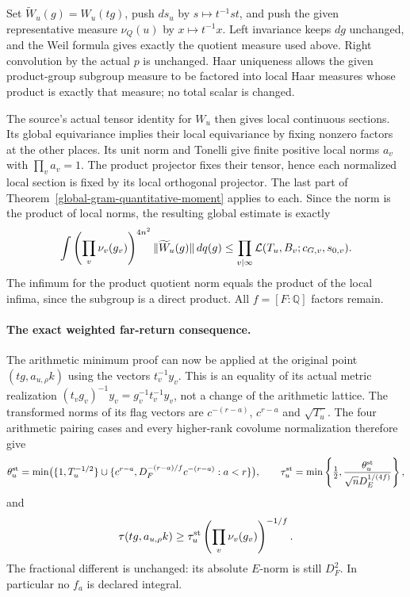Set $\widetilde W_u(g)=W_u(tg)$, push $ds_u$ by
$s\mapsto t^{-1}st$, and push the given representative measure
$\nu_Q(u)$ by $x\mapsto t^{-1}x$.  Left invariance keeps $dg$
unchanged, and the Weil formula gives exactly the quotient
measure used above.  Right convolution by the actual $p$ is
unchanged.  Haar uniqueness allows the given product-group
subgroup measure to be factored into local Haar measures whose
product is exactly that measure; no total scalar is changed.

The source's actual tensor identity for $W_u$ then gives local
continuous sections.  Its global equivariance implies their
local equivariance by fixing nonzero factors at the other
places.  Its unit norm and Tonelli give finite positive local
norms $a_v$ with $\prod_v a_v=1$.  The product projector fixes
their tensor, hence each normalized local section is fixed by
its local orthogonal projector.  The last part of
Theorem~\ref{global-gram-quantitative-moment} applies to each.
Since the norm is the product of local norms, the resulting
global estimate is exactly
\begin{equation}\label{global-gram-quantitative-global-L1}
 \int\left(\prod_v\nu_v(g_v)\right)^{4n^2}
           \|\widetilde W_u(g)\|\,dq(g)
 \le\prod_{v\mid\infty}{\cal L}(T_u,B_v;c_{G,v},s_{0,v}).
\end{equation}
The infimum for the product quotient norm equals the product
of the local infima, since the subgroup is a direct product.
All $f=[F:\mathbb Q]$ factors remain.

\paragraph{The exact weighted far-return consequence.}
The arithmetic minimum proof can now be applied at the original
point $(tg,a_{u,\rho}k)$ using the vectors $t_v^{-1}y_v$.
This is an equality of its actual metric realization
$(t_vg_v)^{-1}y_v=g_v^{-1}t_v^{-1}y_v$, not a change of the
arithmetic lattice.  The transformed norms of its flag vectors
are $c^{-(r-a)}$, $c^{r-a}$ and $\sqrt{T_u}$.
The four arithmetic pairing cases and every higher-rank
covolume normalization therefore give
\[
 \theta_u^{\rm st}=
 \min\bigl(\{1,T_u^{-1/2}\}\cup
 \{c^{r-a},D_F^{-(r-a)/f}c^{-(r-a)}:a<r\}\bigr),\qquad
 \tau_u^{\rm st}=\min\left\{\tfrac12,
       \frac{\theta_u^{\rm st}}{\sqrt nD_E^{1/(4f)}}\right\},
\]
and
\[
 \tau(tg,a_{u,\rho}k)\ge
           \tau_u^{\rm st}\left(\prod_v\nu_v(g_v)\right)^{-1/f}.
\]
The fractional different is unchanged: its absolute $E$-norm
is still $D_F^2$.  In particular no $f_a$ is declared integral.

